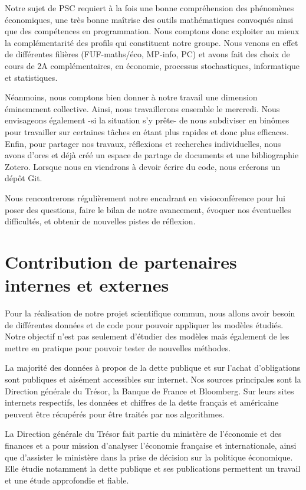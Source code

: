 \documentclass[a4paper]{article}
\begin{document}
Notre sujet de PSC requiert à la fois une bonne compréhension des phénomènes économiques, une très bonne maîtrise des outils mathématiques convoqués ainsi que des compétences en programmation. Nous comptons donc exploiter au mieux la complémentarité des profils qui constituent notre groupe. Nous venons en effet de différentes filières (FUF-maths/éco, MP-info, PC) et avons fait des choix de cours de 2A complémentaires, en économie, processus stochastiques, informatique et statistiques.
 
Néanmoins, nous comptons bien donner à notre travail une dimension éminemment collective.  Ainsi, nous travaillerons ensemble le mercredi. Nous envisageons également -si la situation s’y prête- de nous subdiviser en binômes pour travailler sur certaines tâches en étant plus rapides et donc plus efficaces. Enfin, pour partager nos travaux, réflexions et recherches individuelles, nous avons d’ores et déjà créé un espace de partage de documents et une bibliographie Zotero. Lorsque nous en viendrons à devoir écrire du code, nous créerons un dépôt Git. 
 
Nous rencontrerons régulièrement notre encadrant en visioconférence pour lui poser des questions, faire le bilan de notre avancement, évoquer nos éventuelles difficultés, et obtenir de nouvelles pistes de réflexion. 
\newpage

\section{Contribution de partenaires internes et externes}

Pour la réalisation de notre projet scientifique commun, nous allons avoir besoin de différentes données et de code pour pouvoir appliquer les modèles étudiés. Notre objectif n’est pas seulement d’étudier des modèles mais également de les mettre en pratique pour pouvoir tester de nouvelles méthodes.

La majorité des données à propos de la dette publique et sur l’achat d’obligations sont publiques et aisément accessibles sur internet. Nos sources principales sont la Direction générale du Trésor, la Banque de France et Bloomberg. Sur leurs sites internets respectifs, les données et chiffres de la dette français et américaine peuvent être récupérés pour être traités par nos algorithmes.

La Direction générale du Trésor fait partie du ministère de l’économie et des finances et a pour mission d’analyser l’économie française et internationale, ainsi que d’assister le ministère dans la prise de décision sur la politique économique. Elle étudie notamment la dette publique et ses publications permettent un travail et une étude approfondie et fiable.
\end{document}
